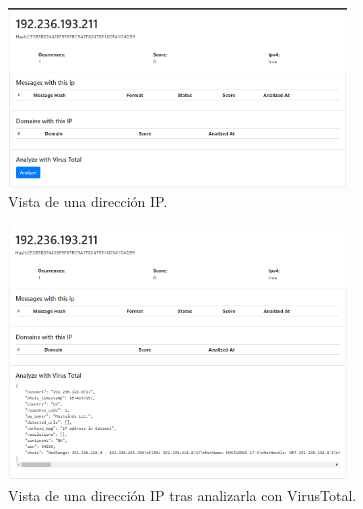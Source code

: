 \begin{figure}[htb]
    \centering
    \includegraphics[width=0.8\textwidth]{imagenes/capturasAplicacion/IP.png}
\caption{Vista de una dirección IP.}
\label{fig:ip}
\end{figure}


\begin{figure}[htb]
    \centering
    \includegraphics[width=0.8\textwidth]{imagenes/capturasAplicacion/IP_vt.png}
\caption{Vista de una dirección IP tras analizarla con VirusTotal.}
\label{fig:ip_vt}
\end{figure}